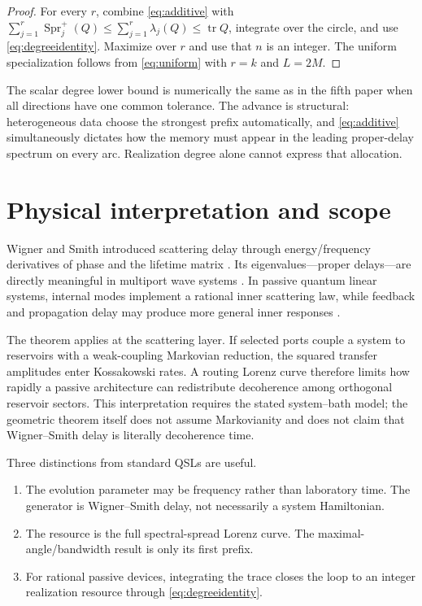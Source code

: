 \documentclass[11pt]{article}
\theoremstyle{definition}
\theoremstyle{remark}
\newcommand{\tr}{\operatorname{tr}}
\newcommand{\Spr}{\operatorname{Spr}^{+}}
\begin{document}
\begin{proof}
For every $r$, combine \eqref{eq:additive} with
$\sum_{j=1}^r\Spr_j(Q)\leq\sum_{j=1}^r\lambda_j(Q)\leq\tr Q$, integrate over
the circle, and use \eqref{eq:degreeidentity}.  Maximize over $r$ and use that
$n$ is an integer.  The uniform specialization follows from
\eqref{eq:uniform} with $r=k$ and $L=2M$.
\end{proof}

The scalar degree lower bound is numerically the same as in the fifth paper
when all directions have one common tolerance.  The advance is structural:
heterogeneous data choose the strongest prefix automatically, and
\eqref{eq:additive} simultaneously dictates how the memory must appear in
the leading proper-delay spectrum on every arc.  Realization degree alone
cannot express that allocation.

\section{Physical interpretation and scope}

Wigner and Smith introduced scattering delay through energy/frequency
derivatives of phase and the lifetime matrix \cite{Wigner1955,Smith1960}.
Its eigenvalues---proper delays---are directly meaningful in multiport wave
systems \cite{PatelMichielssen2021}.  In passive quantum linear systems,
internal modes implement a rational inner scattering law, while feedback and
propagation delay may produce more general inner responses
\cite{GoughZhang2015,TabakMabuchi2016}.

The theorem applies at the scattering layer.  If selected ports couple a
system to reservoirs with a weak-coupling Markovian reduction, the squared
transfer amplitudes enter Kossakowski rates.  A routing Lorenz curve therefore
limits how rapidly a passive architecture can redistribute decoherence among
orthogonal reservoir sectors.  This interpretation requires the stated
system--bath model; the geometric theorem itself does not assume Markovianity
and does not claim that Wigner--Smith delay is literally decoherence time.

Three distinctions from standard QSLs are useful.
\begin{enumerate}
 \item The evolution parameter may be frequency rather than laboratory time.
 The generator is Wigner--Smith delay, not necessarily a system Hamiltonian.
 \item The resource is the full spectral-spread Lorenz curve.  The
 maximal-angle/bandwidth result is only its first prefix.
 \item For rational passive devices, integrating the trace closes the loop to
 an integer realization resource through \eqref{eq:degreeidentity}.
\end{enumerate}
\end{document}
